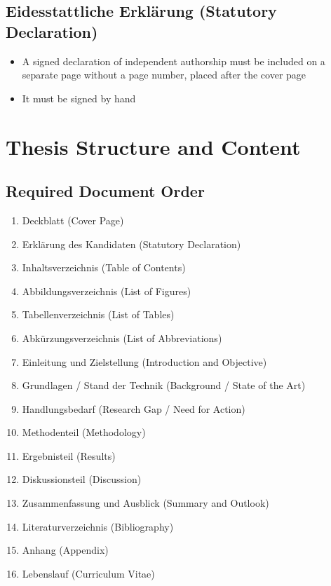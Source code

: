 \subsection{Eidesstattliche Erkl\"arung (Statutory Declaration)}
\begin{itemize}
    \item A signed declaration of independent authorship must be included on a separate page without a page number, placed after the cover page
    \item It must be signed by hand
\end{itemize}


\section{Thesis Structure and Content}

\subsection{Required Document Order}
\begin{enumerate}
    \item Deckblatt (Cover Page)
    \item Erkl\"arung des Kandidaten (Statutory Declaration)
    \item Inhaltsverzeichnis (Table of Contents)
    \item Abbildungsverzeichnis (List of Figures)
    \item Tabellenverzeichnis (List of Tables)
    \item Abk\"urzungsverzeichnis (List of Abbreviations)
    \item Einleitung und Zielstellung (Introduction and Objective)
    \item Grundlagen / Stand der Technik (Background / State of the Art)
    \item Handlungsbedarf (Research Gap / Need for Action)
    \item Methodenteil (Methodology)
    \item Ergebnisteil (Results)
    \item Diskussionsteil (Discussion)
    \item Zusammenfassung und Ausblick (Summary and Outlook)
    \item Literaturverzeichnis (Bibliography)
    \item Anhang (Appendix)
    \item Lebenslauf (Curriculum Vitae)
\end{enumerate}

